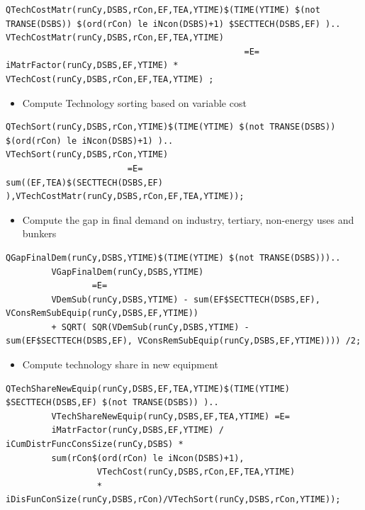 \documentclass[a4paper,]{scrartcl}
\providecommand{\tightlist}{%
  \setlength{\itemsep}{0pt}\setlength{\parskip}{0pt}}
\begin{document}
\begin{lstlisting}
QTechCostMatr(runCy,DSBS,rCon,EF,TEA,YTIME)$(TIME(YTIME) $(not TRANSE(DSBS)) $(ord(rCon) le iNcon(DSBS)+1) $SECTTECH(DSBS,EF) )..
VTechCostMatr(runCy,DSBS,rCon,EF,TEA,YTIME) 
                                               =E=
iMatrFactor(runCy,DSBS,EF,YTIME) * VTechCost(runCy,DSBS,rCon,EF,TEA,YTIME) ;
\end{lstlisting}

\begin{itemize}
\tightlist
\item
  Compute Technology sorting based on variable cost
\end{itemize}

\begin{lstlisting}
QTechSort(runCy,DSBS,rCon,YTIME)$(TIME(YTIME) $(not TRANSE(DSBS)) $(ord(rCon) le iNcon(DSBS)+1) )..
VTechSort(runCy,DSBS,rCon,YTIME)
                        =E=
sum((EF,TEA)$(SECTTECH(DSBS,EF) ),VTechCostMatr(runCy,DSBS,rCon,EF,TEA,YTIME));
\end{lstlisting}

\begin{itemize}
\tightlist
\item
  Compute the gap in final demand on industry, tertiary, non-energy uses
  and bunkers
\end{itemize}

\begin{lstlisting}
QGapFinalDem(runCy,DSBS,YTIME)$(TIME(YTIME) $(not TRANSE(DSBS)))..
         VGapFinalDem(runCy,DSBS,YTIME)
                 =E=
         VDemSub(runCy,DSBS,YTIME) - sum(EF$SECTTECH(DSBS,EF), VConsRemSubEquip(runCy,DSBS,EF,YTIME))
         + SQRT( SQR(VDemSub(runCy,DSBS,YTIME) - sum(EF$SECTTECH(DSBS,EF), VConsRemSubEquip(runCy,DSBS,EF,YTIME)))) /2;
\end{lstlisting}

\begin{itemize}
\tightlist
\item
  Compute technology share in new equipment
\end{itemize}

\begin{lstlisting}
QTechShareNewEquip(runCy,DSBS,EF,TEA,YTIME)$(TIME(YTIME) $SECTTECH(DSBS,EF) $(not TRANSE(DSBS)) )..
         VTechShareNewEquip(runCy,DSBS,EF,TEA,YTIME) =E=
         iMatrFactor(runCy,DSBS,EF,YTIME) / iCumDistrFuncConsSize(runCy,DSBS) *
         sum(rCon$(ord(rCon) le iNcon(DSBS)+1),
                  VTechCost(runCy,DSBS,rCon,EF,TEA,YTIME)
                  * iDisFunConSize(runCy,DSBS,rCon)/VTechSort(runCy,DSBS,rCon,YTIME));
\end{lstlisting}
\end{document}
